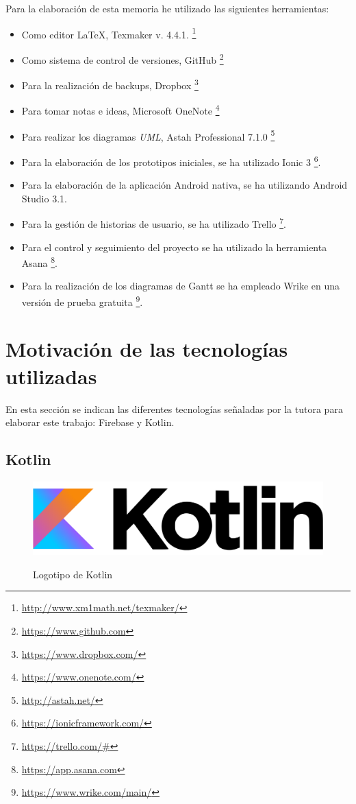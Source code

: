 \documentclass[twoside]{report}
\begin{document}
Para la elaboración de esta memoria he utilizado las siguientes herramientas:
\begin{itemize}
\item Como editor \LaTeX , Texmaker v. 4.4.1. \footnote{\url{http://www.xm1math.net/texmaker/}}
\item Como sistema de control de versiones, GitHub \footnote{\url{https://www.github.com}}
\item Para la realización de backups, Dropbox \footnote{\url{https://www.dropbox.com/}}
\item Para tomar notas e ideas, Microsoft OneNote \footnote{\url{https://www.onenote.com/}}
\item Para realizar los diagramas \textit{UML}, Astah Professional 7.1.0  \footnote{\url{http://astah.net/}}
\item Para la elaboración de los prototipos iniciales, se ha utilizado Ionic 3 \footnote{\url{https://ionicframework.com/}}.
\item Para la elaboración de la aplicación Android nativa, se ha utilizando Android Studio 3.1.
\item Para la gestión de historias de usuario, se ha utilizado Trello \footnote{\url{https://trello.com/#}}.
\item Para el control y seguimiento del proyecto se ha utilizado la herramienta Asana \footnote{\url{https://app.asana.com}}.
\item Para la realización de los diagramas de Gantt se ha empleado Wrike en una versión de prueba gratuita \footnote{\url{https://www.wrike.com/main/}}.
\end{itemize}

\section{Motivación de las tecnologías utilizadas}
En esta sección se indican las diferentes tecnologías señaladas por la tutora para elaborar este trabajo: Firebase y Kotlin.

\subsection{Kotlin}

\begin{figure}[H]
\centering
\includegraphics[scale=0.3]{images/kotlin}\\
\caption{Logotipo de Kotlin} \cite{kotlin}
\end{figure}
\end{document}
